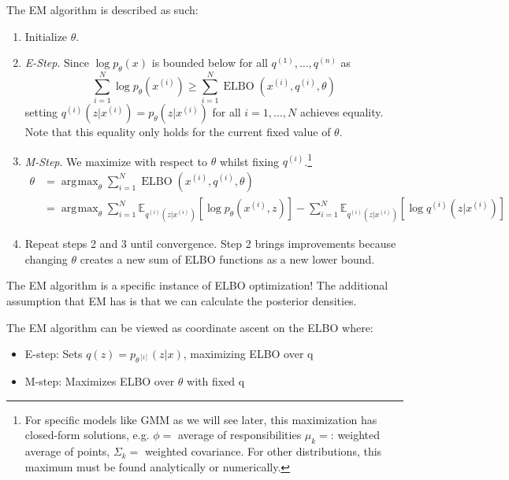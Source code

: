 \documentclass{article}
\DeclareMathOperator{\elbo}{ELBO}
\DeclareMathOperator*{\argmax}{\arg\!\max}
\begin{document}
  \begin{algo}[EM Algorithm]
    The EM algorithm is described as such: 
    \begin{enumerate}
      \item Initialize $\theta$.
      \item \textit{E-Step}. Since $\log p_\theta(x)$ is bounded below for all $q^{(1)}, \ldots, q^{(n)}$ as 
      \begin{equation}
        \sum_{i=1}^N \log p_\theta(x^{(i)}) \geq \sum_{i=1}^N \elbo(x^{(i)}, q^{(i)}, \theta)
      \end{equation}
      setting $q^{(i)}(z|x^{(i)}) = p_\theta(z|x^{(i)})$ for all $i = 1, \ldots, N$ achieves equality. Note that this equality only holds for the current fixed value of $\theta$.

      \item \textit{M-Step}. We maximize with respect to $\theta$ whilst fixing $q^{(i)}$.\footnote{For specific models like GMM as we will see later, this maximization has closed-form solutions, e.g. $\phi = $ average of responsibilities $\mu_k = $: weighted average of points, $\Sigma_k = $ weighted covariance. For other distributions, this maximum must be found analytically or numerically.}
      \begin{align}  
        \theta & = \argmax_\theta \sum_{i=1}^N \elbo(x^{(i)}, q^{(i)}, \theta) \\
        & = \argmax_\theta \sum_{i=1}^N \mathbb{E}_{q^{(i)}(z|x^{(i)})}[\log p_\theta(x^{(i)}, z)] - \sum_{i=1}^N \mathbb{E}_{q^{(i)}(z|x^{(i)})}[\log q^{(i)}(z|x^{(i)})]
      \end{align}

      \item Repeat steps 2 and 3 until convergence. Step 2 brings improvements because changing $\theta$ creates a new sum of ELBO functions as a new lower bound.
    \end{enumerate}
  \end{algo}

  The EM algorithm is a specific instance of ELBO optimization! The additional assumption that EM has is that we can calculate the posterior densities. 

  \begin{corollary}
    The EM algorithm can be viewed as coordinate ascent on the ELBO where:
    \begin{itemize}
      \item E-step: Sets $q(z) = p_{\theta^{[t]}}(z|x)$, maximizing ELBO over q
      \item M-step: Maximizes ELBO over $\theta$ with fixed q
    \end{itemize}
  \end{corollary}
\end{document}
